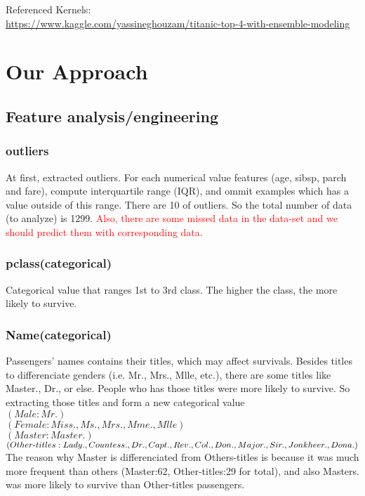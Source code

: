 \documentclass{article}
\begin{document}
Referenced Kernels:\\
\url{https://www.kaggle.com/yassineghouzam/titanic-top-4-with-ensemble-modeling}


\section{Our Approach}
\subsection{Feature analysis/engineering}

\subsubsection*{outliers}
At first, extracted outliers.
For each numerical value features (age, sibsp, parch and fare), compute interquartile range (IQR), and ommit examples which has a value outside of this range.
There are 10 of outliers.
So the total number of data (to analyze) is 1299. 
\textcolor{red}{Also, there are some missed data in the data-set and we should predict them with corresponding data.}

\subsubsection*{pclass(categorical)}
Categorical value that ranges 1st to 3rd class.
The higher the class, the more likely to survive.

\subsubsection*{Name(categorical)}
Passengers' names contains their titles, which may affect survivals.
Besides titles to differenciate genders (i.e. Mr., Mrs., Mlle, etc.), there are some titles like Master., Dr., or else.
People who has those titles were more likely to survive.
So extracting those titles and form a new categorical value\\
 $(Male:Mr.)$\\
 $(Female:Miss., Ms., Mrs., Mme., Mlle)$\\
 $(Master:Master.)$\\
 $(Other\mathchar`-titles:Lady., Countess., Dr., Capt., Rev., Col., Don., Major., Sir., Jonkheer., Dona.)$\\
The reason why Master is differenciated from Others-titles is because it was much more frequent than others (Master:62, Other-titles:29 for total), and also Masters. was more likely to survive than Other-titles passengers.
\end{document}
